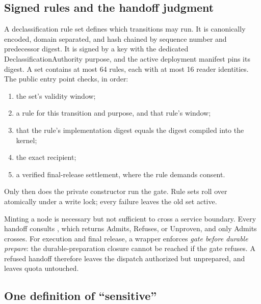 \documentclass[letterpaper,twocolumn,10pt]{article}
\newcommand{\code}[1]{\texttt{\detokenize{#1}}}
\begin{document}
\subsection{Signed rules and the handoff judgment}
\label{sec:rules}

A declassification rule set defines which transitions may run. It is
canonically encoded, domain separated, and hash chained by sequence number
and predecessor digest. It is signed by a key with the dedicated
\textsf{DeclassificationAuthority} purpose, and the active deployment
manifest pins its digest. A set contains at most 64 rules, each with at
most 16 reader identities. The public \code{declassify} entry point checks,
in order:
\begin{enumerate}
\item the set's validity window;
\item a rule for this transition and purpose, and that rule's window;
\item that the rule's implementation digest equals the digest compiled
  into the kernel;
\item the exact recipient;
\item a verified final-release settlement, where the rule demands consent.
\end{enumerate}
Only then does the private constructor run the gate. Rule sets roll over
atomically under a write lock; every failure leaves the old set active.

Minting a node is necessary but not sufficient to cross a service
boundary. Every handoff consults \code{judge_handoff}, which returns
\textsf{Admits}, \textsf{Refuses}, or \textsf{Unproven}, and only
\textsf{Admits} crosses. For execution and final release, a wrapper
enforces \emph{gate before durable prepare}: the durable-preparation
closure cannot be reached if the gate refuses. A refused handoff therefore
leaves the dispatch authorized but unprepared, and leaves quota untouched.

\subsection{One definition of ``sensitive''}
\label{sec:gate}
\end{document}
